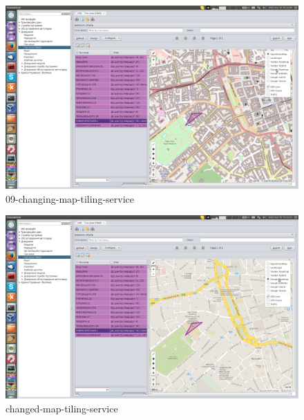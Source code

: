 \begin{figure}[!htp]
\centering
\includegraphics[width=16cm]{chapters/01-geozones/images/09-changing-map-tiling-service.png}
\caption{09-changing-map-tiling-service}\label{fig:09}
\end{figure}

\begin{figure}[!htp]
\centering
\includegraphics[width=16cm]{chapters/01-geozones/images/10-changed-map-tiling-service.png}
\caption{changed-map-tiling-service}\label{fig:10}
\end{figure}